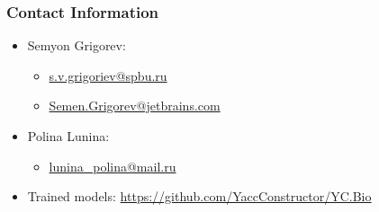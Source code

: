 \documentclass[xcolor=table]{beamer}
\begin{document}
\begin{frame}
\frametitle{Contact Information}
\begin{itemize}
  \item Semyon Grigorev:
    \begin{itemize}
      \item \href{mailto:s.v.grigoriev@spbu.ru}{s.v.grigoriev@spbu.ru}
      \item \href{mailto:Semen.Grigorev@jetbrains.com}{Semen.Grigorev@jetbrains.com}
    \end{itemize}
  \item Polina Lunina:
  \begin{itemize}
    \item  \href{mailto:lunina_polina@mail.ru}{lunina\_polina@mail.ru}
  \end{itemize}
  \item Trained models: \href{https://github.com/YaccConstructor/YC.Bio}{https://github.com/YaccConstructor/YC.Bio}
\end{itemize}
\vspace{2cm}
\end{frame}
\end{document}
